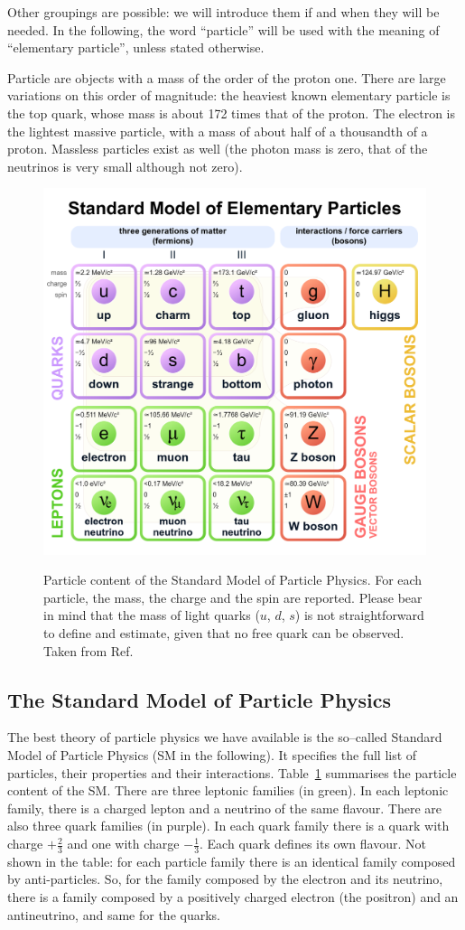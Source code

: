 Other groupings are possible: we will introduce them if and when they will be needed. In the following, the word ``particle'' will be used with the meaning of ``elementary particle'', unless stated otherwise.

Particle are objects with a mass of the order of the proton one. There are large variations on this order of magnitude: the heaviest known elementary particle is the top quark, whose mass is about 172 times that of the proton. The electron is the lightest massive particle, with a mass of about half of a thousandth of a proton. Massless particles exist as well (the photon mass is zero, that of the neutrinos is very small although not zero).

\begin{figure}[tb] 
	\centering
	\includegraphics[width=0.5\columnwidth]{Figures/Standard_Model_of_Elementary_Particles.png}
	\label{tab:SM}
	\caption{Particle content of the Standard Model of Particle Physics. For each particle, the mass, the charge and the spin are reported. Please bear in mind that the mass of light quarks ($u$, $d$, $s$) is not straightforward to define and estimate, given that no free quark can be observed. Taken from Ref.~\cite{SM_wikipedia}}
\end{figure}


\subsection{The Standard Model of Particle Physics} 

The best theory of particle physics we have available is the so--called Standard Model of Particle Physics (SM in the following). It specifies the full list of particles, their properties and their interactions. Table~\ref{tab:SM} summarises the particle content of the SM. There are three leptonic families (in green). In each leptonic family, there is a charged lepton and a neutrino of the same flavour. There are also three quark families (in purple). In each quark family there is a quark with charge $+\frac{2}{3}$ and one with charge $-\frac{1}{3}$. Each quark defines its own flavour. Not shown in the table: for each particle family there is an identical family composed by anti-particles. So, for the family composed by the electron and its neutrino, there is a family composed by a positively charged electron (the positron) and an antineutrino, and same for the quarks. 

